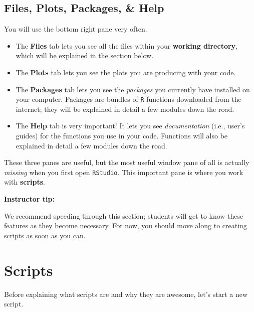 \documentclass[
]{book}
\providecommand{\tightlist}{%
  \setlength{\itemsep}{0pt}\setlength{\parskip}{0pt}}
\begin{document}
\hypertarget{files-plots-packages-help}{%
\subsection*{Files, Plots, Packages, \& Help}\label{files-plots-packages-help}}

You will use the bottom right pane very often.

\begin{itemize}
\tightlist
\item
  The \textbf{Files} tab lets you see all the files within your \textbf{working directory}, which will be explained in the section below.\\
\item
  The \textbf{Plots} tab lets you see the plots you are producing with your code.\\
\item
  The \textbf{Packages} tab lets you see the \emph{packages} you currently have installed on your computer. Packages are bundles of \texttt{R} functions downloaded from the internet; they will be explained in detail a few modules down the road.\\
\item
  The \textbf{Help} tab is very important! It lets you see \emph{documentation} (i.e., user's guides) for the functions you use in your code. Functions will also be explained in detail a few modules down the road.
\end{itemize}

These three panes are useful, but the most useful window pane of all is actually \emph{missing} when you first open \texttt{RStudio}. This important pane is where you work with \textbf{scripts}.

\leavevmode\hypertarget{tip-text}{}%
\textbf{Instructor tip:}

We recommend speeding through this section; students will get to know these features as they become necessary. For now, you should move along to creating scripts as soon as you can.

\hypertarget{scripts}{%
\section*{Scripts}\label{scripts}}

Before explaining what scripts are and why they are awesome, let's start a new script.
\end{document}
